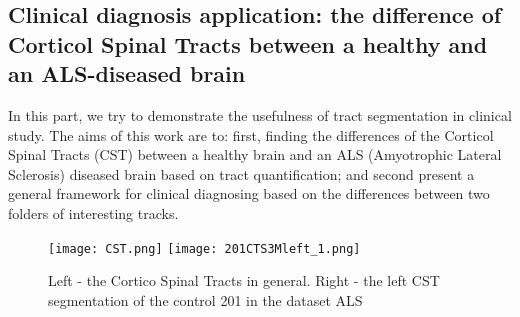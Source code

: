 \subsection{Clinical diagnosis application: the difference of Corticol Spinal Tracts between a healthy and an ALS-diseased brain}
\label{subsec:result_ALS}
In this part, we try to demonstrate the usefulness of tract segmentation in clinical study. 
The aims of this work are to: first, finding the differences of the Corticol Spinal Tracts (CST) between a healthy brain and an ALS (Amyotrophic Lateral Sclerosis) diseased brain based on tract quantification; and second present a general framework for clinical diagnosing based on the differences between two folders of interesting tracks.
\begin{figure}
  \centering
  \texttt{[image: CST.png]}
  \texttt{[image: 201CTS3Mleft\_1.png]}
  \caption{Left - the Cortico Spinal Tracts in general. Right - the left CST segmentation of the control 201 in the dataset ALS}%
  \label{fig:CST}
\end{figure}
